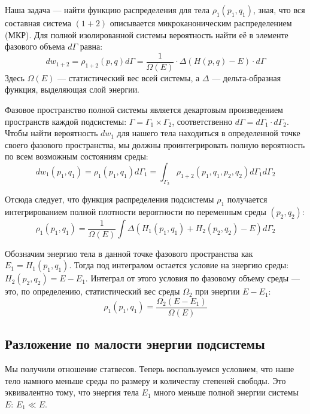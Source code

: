 \documentclass[../general/general]{subfiles}
\begin{document}
Наша задача — найти функцию распределения для тела $\rho_1(p_1, q_1)$, зная, что вся составная система $(1+2)$ описывается микроканоническим распределением (МКР). Для полной изолированной системы вероятность найти её в элементе фазового объема $d\Gamma$ равна:
\begin{equation}
dw_{1+2} = \rho_{1+2}(p, q) d\Gamma = \frac{1}{\Omega(E)} \cdot \Delta(H(p, q) - E) \cdot d\Gamma
\end{equation}
Здесь $\Omega(E)$ — статистический вес всей системы, а $\Delta$ — дельта-образная функция, выделяющая слой энергии.

Фазовое пространство полной системы является декартовым произведением пространств каждой подсистемы: $\Gamma = \Gamma_1 \times \Gamma_2$, соответственно $d\Gamma = d\Gamma_1 \cdot d\Gamma_2$.
Чтобы найти вероятность $dw_1$ для нашего тела находиться в определенной точке своего фазового пространства, мы должны проинтегрировать полную вероятность по всем возможным состояниям среды:
\begin{equation}
dw_1(p_1, q_1) = \rho_1(p_1, q_1) d\Gamma_1 = \int_{\Gamma_2} \rho_{1+2}(p_1, q_1, p_2, q_2) d\Gamma_1 d\Gamma_2
\end{equation}

Отсюда следует, что функция распределения подсистемы $\rho_1$ получается интегрированием полной плотности вероятности по переменным среды $(p_2, q_2)$:
\begin{equation}
\rho_1(p_1, q_1) = \frac{1}{\Omega(E)} \int \Delta(H_1(p_1, q_1) + H_2(p_2, q_2) - E) d\Gamma_2
\end{equation}

Обозначим энергию тела в данной точке фазового пространства как $E_1 = H_1(p_1, q_1)$. Тогда под интегралом остается условие на энергию среды: $H_2(p_2, q_2) = E - E_1$. Интеграл от этого условия по фазовому объему среды — это, по определению, статистический вес среды $\Omega_2$ при энергии $E - E_1$:
\begin{equation}
\rho_1(p_1, q_1) = \frac{\Omega_2(E - E_1)}{\Omega(E)}
\end{equation}

\subsection{Разложение по малости энергии подсистемы}

Мы получили отношение статвесов. Теперь воспользуемся условием, что наше тело намного меньше среды по размеру и количеству степеней свободы. Это эквивалентно тому, что энергия тела $E_1$ много меньше полной энергии системы $E$: $E_1 \ll E$.
\end{document}
